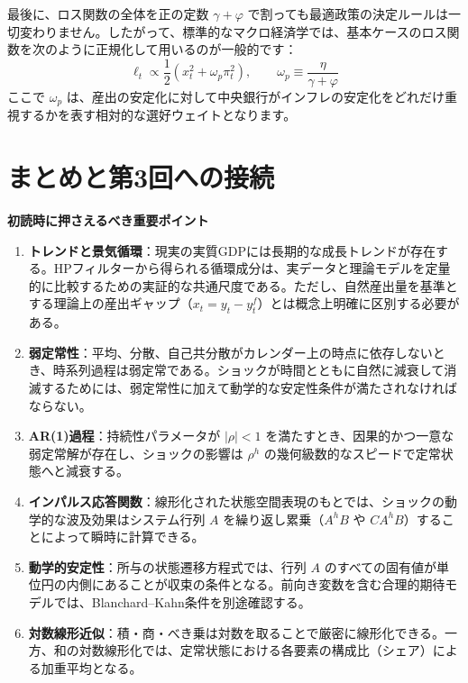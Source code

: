 \documentclass[
  japanese,
  lualatex,
  ja=standard,
  12pt,
  a4paper]{ltjsarticle}
\providecommand{\tightlist}{%
  \setlength{\itemsep}{0pt}\setlength{\parskip}{0pt}}
\begin{document}
最後に、ロス関数の全体を正の定数 \(\gamma+\varphi\)
で割っても最適政策の決定ルールは一切変わりません。したがって、標準的なマクロ経済学では、基本ケースのロス関数を次のように正規化して用いるのが一般的です：
\[
\ell_t
\propto
\frac{1}{2}
\left(
x_t^2+\omega_p\pi_t^2
\right),
\qquad
\omega_p\equiv\frac{\eta}{\gamma+\varphi}
\] ここで \(\omega_p\)
は、産出の安定化に対して中央銀行がインフレの安定化をどれだけ重視するかを表す相対的な選好ウェイトとなります。


\section{まとめと第3回への接続}\label{ux307eux3068ux3081ux3068ux7b2c3ux56deux3078ux306eux63a5ux7d9a}

\textbf{初読時に押さえるべき重要ポイント}

\begin{enumerate}
\def\labelenumi{\arabic{enumi}.}
\tightlist
\item
  \textbf{トレンドと景気循環}：現実の実質GDPには長期的な成長トレンドが存在する。HPフィルターから得られる循環成分は、実データと理論モデルを定量的に比較するための実証的な共通尺度である。ただし、自然産出量を基準とする理論上の産出ギャップ（\(x_t=y_t-y_t^f\)）とは概念上明確に区別する必要がある。
\item
  \textbf{弱定常性}：平均、分散、自己共分散がカレンダー上の時点に依存しないとき、時系列過程は弱定常である。ショックが時間とともに自然に減衰して消滅するためには、弱定常性に加えて動学的な安定性条件が満たされなければならない。
\item
  \textbf{AR(1)過程}：持続性パラメータが \(|\rho|<1\)
  を満たすとき、因果的かつ一意な弱定常解が存在し、ショックの影響は
  \(\rho^h\) の幾何級数的なスピードで定常状態へと減衰する。
\item
  \textbf{インパルス応答関数}：線形化された状態空間表現のもとでは、ショックの動学的な波及効果はシステム行列
  \(A\) を繰り返し累乗（\(A^hB\) や
  \(CA^hB\)）することによって瞬時に計算できる。
\item
  \textbf{動学的安定性}：所与の状態遷移方程式では、行列 \(A\)
  のすべての固有値が単位円の内側にあることが収束の条件となる。前向き変数を含む合理的期待モデルでは、Blanchard--Kahn条件を別途確認する。
\item
  \textbf{対数線形近似}：積・商・べき乗は対数を取ることで厳密に線形化できる。一方、和の対数線形化では、定常状態における各要素の構成比（シェア）による加重平均となる。
\end{enumerate}
\end{document}
